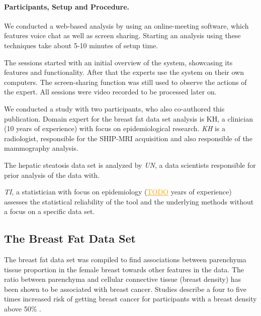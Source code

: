 \documentclass[journal]{style/vgtc} 			          %
\newcommand{\com}[1]{\textcolor{orange}{\uline{#1}}}
\begin{document}
\paragraph{Participants, Setup and Procedure.}
We conducted a web-based analysis by using an online-meeting software, which features voice chat as well as screen sharing.
Starting an analysis using these techniques take about 5-10 minutes of setup time.

The sessions started with an initial overview of the system, showcasing its features and functionality.
After that the experts use the system on their own computers.
The screen-sharing function was still used to observe the actions of the expert.
All sessions were video recorded to be processed later on.

We conducted a study with two participants, who also co-authored this publication.
Domain expert for the breast fat data set analysis is KH, a clinician (10 years of experience) with focus on epidemiological research.
\emph{KH} is a radiologist, responsible for the SHIP-MRI acquisition and also responsible of the mammography analysis.

The hepatic steatosis data set is analyzed by \emph{UN}, a data scientists responsible for prior analysis of the data with.

\emph{TI}, a statistician with focus on epidemiology (\com{TODO} years of experience) assesses the statistical reliability of the tool and the underlying methods without a focus on a specific data set.
\subsection{The Breast Fat Data Set}
The breast fat data set was compiled to find associations between parenchyma tissue proportion in the female breast towards other features in the data.
The ratio between parenchyma and cellular connective tissue (breast density) has been shown to be associated with breast cancer.
Studies describe a four to five times increased risk of getting breast cancer for participants with a breast density above 50\% \cite{Mccormack2006}.
\end{document}
